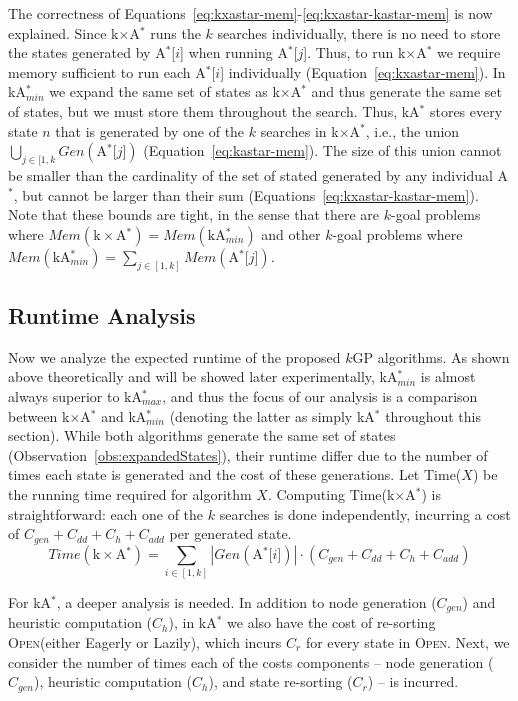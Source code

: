 \documentclass{aicom2e}
\newcommand{\kgs}{$k$GP}
\newcommand{\astar}{A$^*$}
\newcommand{\kastar}{kA$^*$}
\newcommand{\kastarmin}{kA$^*_{min}$}
\newcommand{\kastarmax}{kA$^*_{max}$}
\newcommand{\kxastar}{k$\times$A$^*$}
\newcommand{\astari}[1]{A$^*$[$#1$]}
\newcommand{\open}{\textsc{Open}}
\begin{document}
The correctness of Equations~\ref{eq:kxastar-mem}-\ref{eq:kxastar-kastar-mem}
is now explained. Since \kxastar{} runs the $k$ searches individually, there is
no need to store the states generated by \astari{i} when running \astari{j}.
Thus, to run \kxastar{} we require memory sufficient to run each \astari{i}
individually (Equation~\ref{eq:kxastar-mem}). In \kastarmin{} we expand the
same set of states as \kxastar{} and thus generate the same set of states, but
we must store them throughout the search. Thus, \kastar{} stores every state
$n$ that is  generated by one of the $k$ searches in \kxastar{}, i.e., the
union $\bigcup_{j\in[1,k}Gen(\text{\astari{j}})$
(Equation~\ref{eq:kastar-mem}). The size of this union cannot be smaller than
the cardinality of the set of stated generated by any individual \astar{}, but
cannot be larger than their sum (Equations~\ref{eq:kxastar-kastar-mem}). Note
that these bounds are tight, in the sense that there are $k$-goal problems
where $Mem(\text{\kxastar{}}) = Mem(\text{\kastarmin{}})$ and other $k$-goal
problems where $Mem(\text{\kastarmin{}}) = \sum_{j\in[1,k]}
Mem(\text{\astari{j}})$.


\subsection{Runtime Analysis}

Now we analyze the expected runtime of the proposed \kgs{} algorithms. As shown
above theoretically and will be showed later experimentally, \kastarmin{} is
almost always superior to \kastarmax{}, and thus the focus of our analysis is a
comparison between \kxastar{} and \kastarmin{} (denoting the latter as simply \kastar{} throughout this section).  While both algorithms generate
the same set of states (Observation~\ref{obs:expandedStates}), their runtime
differ due to the number of times each state is generated and the cost of these
generations. Let Time($X$) be the running time required for algorithm $X$.
Computing Time(\kxastar{}) is straightforward: each one of the $k$ searches is
done independently, incurring a cost of $C_{gen}+C_{dd}+C_h+C_{add}$ per
generated state.
\[
Time(\text{\kxastar{}}) = \sum_{i\in[1,k]} |Gen(\text{\astari{i}})|\cdot (C_{gen}+C_{dd}+C_h+C_{add})
\]

For \kastar{}, a deeper analysis is needed. In addition to node generation ($C_{gen}$) and heuristic computation ($C_h$), in \kastar{} we also have the cost of re-sorting \open (either Eagerly or Lazily), which incurs $C_r$ for every state in \open{}. 
Next, we consider the number of 
times each of the costs components -- node generation ($C_{gen}$), heuristic computation ($C_h$), and state re-sorting ($C_r$) -- is incurred.
\end{document}
